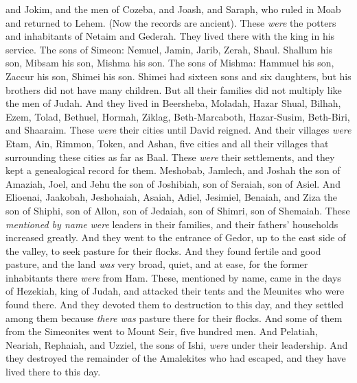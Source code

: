 \begin{biblechapter}
\verse and Jokim, and the men of Cozeba, and Joash, and Saraph, who ruled in Moab and returned to Lehem. (Now the records are ancient).
\verse These \textit{were} the potters and inhabitants of Netaim and Gederah. They lived there with the king in his service.
 The sons of Simeon: Nemuel, Jamin, Jarib, Zerah, Shaul.
\verse Shallum his son, Mibsam his son, Mishma his son.
\verse The sons of Mishma: Hammuel his son, Zaccur his son, Shimei his son.
\verse Shimei had sixteen sons and six daughters, but his brothers did not have many children. But all their families did not multiply like the men of Judah.
\verse And they lived in Beersheba, Moladah, Hazar Shual,
\verse Bilhah, Ezem, Tolad,
\verse Bethuel, Hormah, Ziklag,
\verse Beth-Marcaboth, Hazar-Susim, Beth-Biri, and Shaaraim. These \textit{were} their cities until David reigned.
\verse And their villages \textit{were} Etam, Ain, Rimmon, Token, and Ashan, five cities
\verse and all their villages that surrounding these cities as far as Baal. These \textit{were} their settlements, and they kept a genealogical record for them.
\verse Meshobab, Jamlech, and Joshah the son of Amaziah,
\verse Joel, and Jehu the son of Joshibiah, son of Seraiah, son of Asiel.
\verse And Elioenai, Jaakobah, Jeshohaiah, Asaiah, Adiel, Jesimiel, Benaiah,
\verse and Ziza the son of Shiphi, son of Allon, son of Jedaiah, son of Shimri, son of Shemaiah.
\verse These \textit{mentioned by name} \textit{were} leaders in their families, and their fathers’ households increased greatly.
\verse And they went to the entrance of Gedor, up to the east side of the valley, to seek pasture for their flocks.
\verse And they found fertile and good pasture, and the land \textit{was} very broad, quiet, and at ease, for the former inhabitants there \textit{were} from Ham.
\verse These, mentioned by name, came in the days of Hezekiah, king of Judah, and attacked their tents and the Meunites who were found there. And they devoted them to destruction to this day, and they settled among them because \textit{there was} pasture there for their flocks.
\verse And some of them from the Simeonites went to Mount Seir, five hundred men. And Pelatiah, Neariah, Rephaiah, and Uzziel, the sons of Ishi, \textit{were} under their leadership.
\verse And they destroyed the remainder of the Amalekites who had escaped, and they have lived there to this day.
\end{biblechapter}


